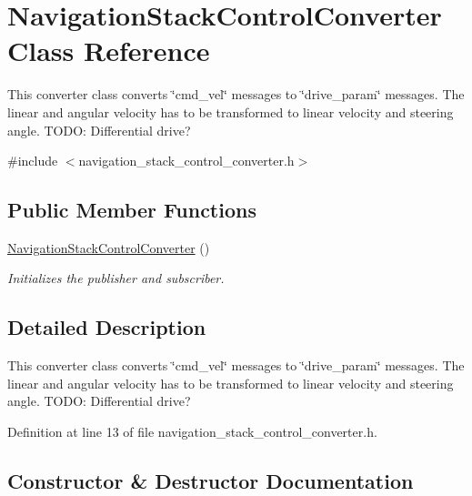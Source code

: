 \hypertarget{class_navigation_stack_control_converter}{}\section{Navigation\+Stack\+Control\+Converter Class Reference}
\label{class_navigation_stack_control_converter}


This converter class converts \char`\"{}cmd\+\_\+vel\char`\"{} messages to \char`\"{}drive\+\_\+param\char`\"{} messages. The linear and angular velocity has to be transformed to linear velocity and steering angle. T\+O\+DO\+: Differential drive?  




{\ttfamily \#include $<$navigation\+\_\+stack\+\_\+control\+\_\+converter.\+h$>$}

\subsection*{Public Member Functions}
\begin{DoxyCompactItemize}
\item 
\hyperlink{class_navigation_stack_control_converter_aaa467e7f68ffb78c9778cdeedc972fac}{Navigation\+Stack\+Control\+Converter} ()
\begin{DoxyCompactList}\small\item\em Initializes the publisher and subscriber. \end{DoxyCompactList}\end{DoxyCompactItemize}


\subsection{Detailed Description}
This converter class converts \char`\"{}cmd\+\_\+vel\char`\"{} messages to \char`\"{}drive\+\_\+param\char`\"{} messages. The linear and angular velocity has to be transformed to linear velocity and steering angle. T\+O\+DO\+: Differential drive? 

Definition at line 13 of file navigation\+\_\+stack\+\_\+control\+\_\+converter.\+h.



\subsection{Constructor \& Destructor Documentation}

